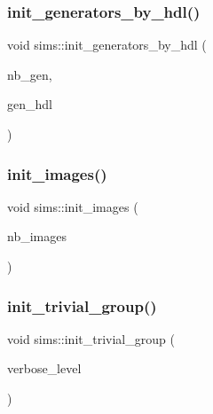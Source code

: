 \mbox{\label{classsims_a116abb02245f99c0152d867e0e640c77}} 
\subsubsection{\texorpdfstring{init\+\_\+generators\+\_\+by\+\_\+hdl()}{init\_generators\_by\_hdl()}}
{\footnotesize\ttfamily void sims\+::init\+\_\+generators\+\_\+by\+\_\+hdl (\begin{DoxyParamCaption}\item[{\mbox{\hyperlink{galois_8h_a09fddde158a3a20bd2dcadb609de11dc}{I\+NT}}}]{nb\+\_\+gen,  }\item[{\mbox{\hyperlink{galois_8h_a09fddde158a3a20bd2dcadb609de11dc}{I\+NT}} $\ast$}]{gen\+\_\+hdl }\end{DoxyParamCaption})}

\mbox{\label{classsims_a7fb1a9d3c6355c551f495d3d79e2303e}} 
\subsubsection{\texorpdfstring{init\+\_\+images()}{init\_images()}}
{\footnotesize\ttfamily void sims\+::init\+\_\+images (\begin{DoxyParamCaption}\item[{\mbox{\hyperlink{galois_8h_a09fddde158a3a20bd2dcadb609de11dc}{I\+NT}}}]{nb\+\_\+images }\end{DoxyParamCaption})}

\mbox{\label{classsims_a6a55a0a4e5124654f999933fd635334a}} 
\subsubsection{\texorpdfstring{init\+\_\+trivial\+\_\+group()}{init\_trivial\_group()}}
{\footnotesize\ttfamily void sims\+::init\+\_\+trivial\+\_\+group (\begin{DoxyParamCaption}\item[{\mbox{\hyperlink{galois_8h_a09fddde158a3a20bd2dcadb609de11dc}{I\+NT}}}]{verbose\+\_\+level }\end{DoxyParamCaption})}

